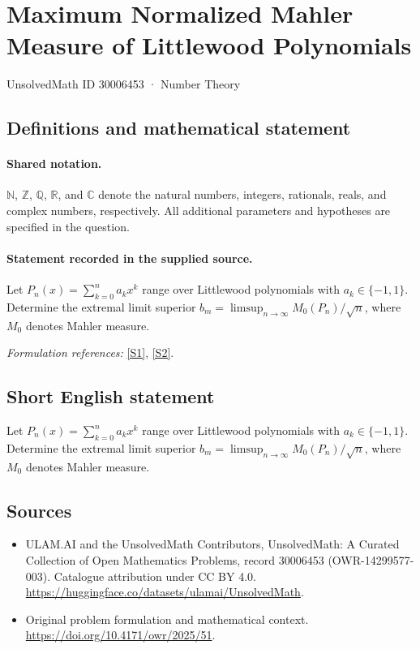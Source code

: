 \documentclass[11pt]{article}
\newcommand{\sref}[2]{\hyperlink{source:#1:#2}{[S#2]}}
\begin{document}
\setcounter{section}{30006452}
\section{Maximum Normalized Mahler Measure of Littlewood Polynomials}\label{30006453}
{\small UnsolvedMath ID 30006453 · Number Theory}
\subsection{Definitions and mathematical statement}

\paragraph{Shared notation.}$\mathbb N$, $\mathbb Z$, $\mathbb Q$, $\mathbb R$, and $\mathbb C$ denote the natural numbers, integers, rationals, reals, and complex numbers, respectively. All additional parameters and hypotheses are specified in the question.


\paragraph{Statement recorded in the supplied source.}
Let $P_n(x)=\sum_{k=0}^n a_kx^k$ range over Littlewood polynomials with $a_k\in\{-1,1\}$. Determine the extremal limit superior $b_m=\limsup_{n\to\infty}M_0(P_n)/\sqrt{n}$, where $M_0$ denotes Mahler measure.
\par\smallskip\textit{Formulation references:} \sref{30006453}{1}, \sref{30006453}{2}.
\subsection{Short English statement}
Let $P_n(x)=\sum_{k=0}^n a_kx^k$ range over Littlewood polynomials with $a_k\in\{-1,1\}$. Determine the extremal limit superior $b_m=\limsup_{n\to\infty}M_0(P_n)/\sqrt{n}$, where $M_0$ denotes Mahler measure.
\subsection{Sources}
\begin{itemize}
\item[\hypertarget{source:30006453:1}{S1}] ULAM.AI and the UnsolvedMath Contributors, UnsolvedMath: A Curated Collection of Open Mathematics Problems, record 30006453 (OWR-14299577-003). Catalogue attribution under CC BY 4.0.
\url{https://huggingface.co/datasets/ulamai/UnsolvedMath}.
\item[\hypertarget{source:30006453:2}{S2}] Original problem formulation and mathematical context.
\url{https://doi.org/10.4171/owr/2025/51}.
\end{itemize}
\label{end:30006453}
\end{document}
